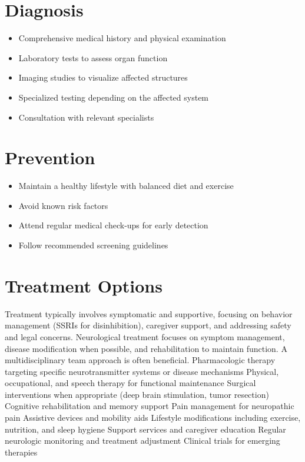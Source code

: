 \section{Diagnosis}
\begin{itemize}[noitemsep]
  \item Comprehensive medical history and physical examination
  \item Laboratory tests to assess organ function
  \item Imaging studies to visualize affected structures
  \item Specialized testing depending on the affected system
  \item Consultation with relevant specialists
\end{itemize}
\section{Prevention}
\begin{itemize}[noitemsep]
  \item Maintain a healthy lifestyle with balanced diet and exercise
  \item Avoid known risk factors
  \item Attend regular medical check-ups for early detection
  \item Follow recommended screening guidelines
\end{itemize}
\section{Treatment Options}
Treatment typically involves symptomatic and supportive, focusing on behavior management (SSRIs for disinhibition), caregiver support, and addressing safety and legal concerns. Neurological treatment focuses on symptom management, disease modification when possible, and rehabilitation to maintain function. A multidisciplinary team approach is often beneficial. Pharmacologic therapy targeting specific neurotransmitter systems or disease mechanisms Physical, occupational, and speech therapy for functional maintenance Surgical interventions when appropriate (deep brain stimulation, tumor resection) Cognitive rehabilitation and memory support Pain management for neuropathic pain Assistive devices and mobility aids Lifestyle modifications including exercise, nutrition, and sleep hygiene Support services and caregiver education Regular neurologic monitoring and treatment adjustment Clinical trials for emerging therapies

